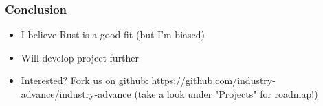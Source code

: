 \documentclass{beamer}
\begin{document}
\begin{frame}
\frametitle{Conclusion}
\begin{itemize}
    \item I believe Rust is a good fit (but I'm biased)
	\item Will develop project further
	\item Interested? Fork us on github: https://github.com/industry-advance/industry-advance (take a look under "Projects" for roadmap!)
\end{itemize}
\end{frame}
\end{document}
